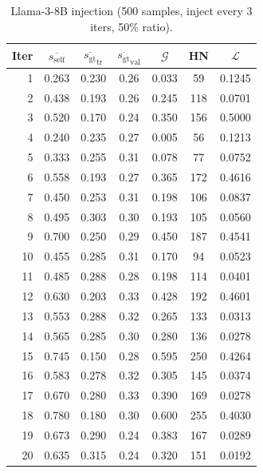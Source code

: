 \documentclass{article}
\newcommand{\gap}{\mathcal{G}}          %
\newcommand{\self}{s_{\text{self}}}     %
\newcommand{\gt}{s_{\text{gt}}}         %
\begin{document}
\begin{table}[h]
\centering
\caption{Llama-3-8B injection (500 samples, inject every 3 iters, 50\% ratio).}
\label{tab:app-llama3-inj}
\small
\begin{tabular}{rcccccc}
\toprule
Iter & $\overline{\self}$ & $\overline{\gt}_\text{tr}$ & $\overline{\gt}_\text{val}$ & $\gap$ & HN & $\mathcal{L}$ \\
\midrule
1  & 0.263 & 0.230 & 0.26 & 0.033 & 59  & 0.1245 \\
2  & 0.438 & 0.193 & 0.26 & 0.245 & 118 & 0.0701 \\
3  & 0.520 & 0.170 & 0.24 & 0.350 & 156 & 0.5000 \\
4  & 0.240 & 0.235 & 0.27 & 0.005 & 56  & 0.1213 \\
5  & 0.333 & 0.255 & 0.31 & 0.078 & 77  & 0.0752 \\
6  & 0.558 & 0.193 & 0.27 & 0.365 & 172 & 0.4616 \\
7  & 0.450 & 0.253 & 0.31 & 0.198 & 106 & 0.0837 \\
8  & 0.495 & 0.303 & 0.30 & 0.193 & 105 & 0.0560 \\
9  & 0.700 & 0.250 & 0.29 & 0.450 & 187 & 0.4541 \\
10 & 0.455 & 0.285 & 0.31 & 0.170 & 94  & 0.0523 \\
11 & 0.485 & 0.288 & 0.28 & 0.198 & 114 & 0.0401 \\
12 & 0.630 & 0.203 & 0.33 & 0.428 & 192 & 0.4601 \\
13 & 0.553 & 0.288 & 0.32 & 0.265 & 133 & 0.0313 \\
14 & 0.565 & 0.285 & 0.30 & 0.280 & 136 & 0.0278 \\
15 & 0.745 & 0.150 & 0.28 & 0.595 & 250 & 0.4264 \\
16 & 0.583 & 0.278 & 0.32 & 0.305 & 145 & 0.0374 \\
17 & 0.670 & 0.280 & 0.33 & 0.390 & 169 & 0.0278 \\
18 & 0.780 & 0.180 & 0.30 & 0.600 & 255 & 0.4030 \\
19 & 0.673 & 0.290 & 0.24 & 0.383 & 167 & 0.0289 \\
20 & 0.635 & 0.315 & 0.24 & 0.320 & 151 & 0.0192 \\
\bottomrule
\end{tabular}
\end{table}
\end{document}
